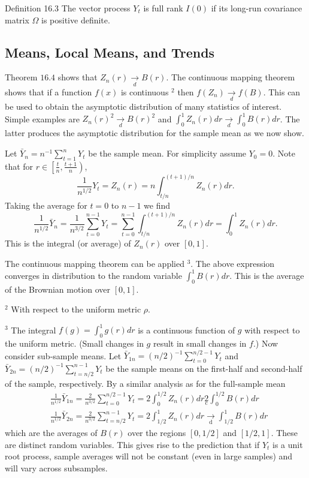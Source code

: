 \documentclass[10pt]{article}
\begin{document}
Definition 16.3 The vector process $Y_{t}$ is full rank $I(0)$ if its long-run covariance matrix $\Omega$ is positive definite.

\subsection{Means, Local Means, and Trends}
Theorem $16.4$ shows that $Z_{n}(r) \underset{d}{\longrightarrow} B(r)$. The continuous mapping theorem shows that if a function $f(x)$ is continuous ${ }^{2}$ then $f\left(Z_{n}\right) \underset{d}{\longrightarrow} f(B)$. This can be used to obtain the asymptotic distribution of many statistics of interest. Simple examples are $Z_{n}(r)^{2} \underset{d}{\longrightarrow} B(r)^{2}$ and $\int_{0}^{1} Z_{n}(r) d r \underset{d}{\longrightarrow} \int_{0}^{1} B(r) d r$. The latter produces the asymptotic distribution for the sample mean as we now show.

Let $\bar{Y}_{n}=n^{-1} \sum_{t=1}^{n} Y_{t}$ be the sample mean. For simplicity assume $Y_{0}=0$. Note that for $r \in\left[\frac{t}{n}, \frac{t+1}{n}\right)$,
$$
\frac{1}{n^{1 / 2}} Y_{t}=Z_{n}(r)=n \int_{t / n}^{(t+1) / n} Z_{n}(r) d r .
$$
Taking the average for $t=0$ to $n-1$ we find
$$
\frac{1}{n^{1 / 2}} \bar{Y}_{n}=\frac{1}{n^{3 / 2}} \sum_{t=0}^{n-1} Y_{t}=\sum_{t=0}^{n-1} \int_{t / n}^{(t+1) / n} Z_{n}(r) d r=\int_{0}^{1} Z_{n}(r) d r .
$$
This is the integral (or average) of $Z_{n}(r)$ over $[0,1]$.

The continuous mapping theorem can be applied ${ }^{3}$. The above expression converges in distribution to the random variable $\int_{0}^{1} B(r) d r$. This is the average of the Brownian motion over $[0,1]$.

${ }^{2}$ With respect to the uniform metric $\rho$.

${ }^{3}$ The integral $f(g)=\int_{0}^{1} g(r) d r$ is a continuous function of $g$ with respect to the uniform metric. (Small changes in $g$ result in small changes in $f$.) Now consider sub-sample means. Let $\bar{Y}_{1 n}=(n / 2)^{-1} \sum_{t=0}^{n / 2-1} Y_{t}$ and $\bar{Y}_{2 n}=(n / 2)^{-1} \sum_{t=n / 2}^{n-1} Y_{t}$ be the sample means on the first-half and second-half of the sample, respectively. By a similar analysis as for the full-sample mean
$$
\begin{aligned}
&\frac{1}{n^{1 / 2}} \bar{Y}_{1 n}=\frac{2}{n^{3 / 2}} \sum_{t=0}^{n / 2-1} Y_{t}=2 \int_{0}^{1 / 2} Z_{n}(r) d r \underset{\mathrm{c}}{2} \int_{0}^{1 / 2} B(r) d r \\
&\frac{1}{n^{1 / 2}} \bar{Y}_{2 n}=\frac{2}{n^{3 / 2}} \sum_{t=n / 2}^{n-1} Y_{t}=2 \int_{1 / 2}^{1} Z_{n}(r) d r \underset{\mathrm{d}}{\longrightarrow} \int_{1 / 2}^{1} B(r) d r
\end{aligned}
$$
which are the averages of $B(r)$ over the regions $[0,1 / 2]$ and $[1 / 2,1]$. These are distinct random variables. This gives rise to the prediction that if $Y_{t}$ is a unit root process, sample averages will not be constant (even in large samples) and will vary across subsamples.
\end{document}
